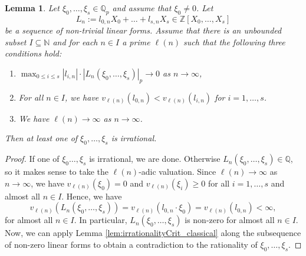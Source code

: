 \documentclass[12pt]{article}
\newtheorem{lemma}[theorem]{Lemma}
\numberwithin{equation}{section}
\begin{document}
\begin{lemma}\label{lem:irrationalityCrit}
Let $\xi_0,\dots,\xi_s\in \mathbb{Q}_p$ and assume that $\xi_0\neq 0$. Let 
\[
	L_n:=l_{0,n}X_0+\dots + l_{s,n}X_s\in \mathbb{Z}[X_0,\dots, X_s] 
\]
be a sequence of non-trivial linear forms. Assume that there is an unbounded subset $I\subseteq\mathbb{N}$ and for each $n\in I$ a prime $\ell(n)$ such that the following three conditions hold:
\begin{enumerate}
\item\label{lem:irrationalityCrit:i} $ \max_{0\leqslant i\leqslant s}|l_{i,n}|\cdot |L_n(\xi_0,\dots,\xi_s)|_p\rightarrow 0$ as $n\to \infty$,
\item\label{lem:irrationalityCrit:ii} For all $n\in I$, we have $v_{\ell(n)}(l_{0,n})<v_{\ell(n)}(l_{i,n})$ for $i=1,\dots,s$.
\item\label{lem:irrationalityCrit:iii} We have $\ell(n)\to \infty $ as $n\to \infty$.
\end{enumerate}
Then at least one of $\xi_0,\dots,\xi_s$ is irrational. 
\end{lemma}
\begin{proof}
If one of $\xi_0\dots, \xi_s$ is irrational, we are done. Otherwise $L_n(\xi_0,\dots,\xi_s)\in \mathbb{Q}$, so it makes sense to take the $\ell(n)$-adic valuation. Since $\ell(n)\to \infty$ as $n\to \infty$, we have $v_{\ell(n)}(\xi_0)=0$ and $v_{\ell(n)}(\xi_i)\geqslant 0$ for all $i=1,\dots, s$ and almost all $n\in I$. Hence, we have
\[
	v_{\ell(n)}(L_n(\xi_0,\dots,\xi_s))= v_{\ell(n)}(l_{0,n}\cdot \xi_0)=v_{\ell(n)}(l_{0,n})<\infty ,
\]
for almost all $n\in I$. In particular, $L_n(\xi_0,\dots,\xi_s)$ is non-zero for almost all $n \in I$. Now, we can apply Lemma \ref{lem:irrationalityCrit_classical} along the subsequence of non-zero linear forms to obtain a contradiction to the rationality of $\xi_0,\dots, \xi_s$.
\end{proof}
\end{document}
